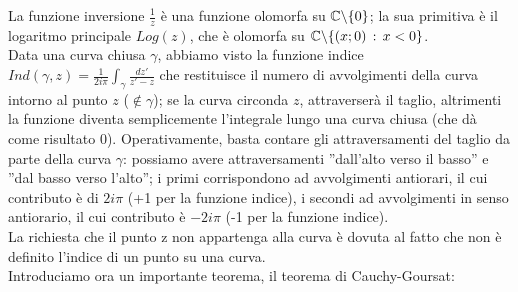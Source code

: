 La funzione inversione $\frac{1}{z}$  è una funzione olomorfa su $\mathbb{C} \backslash \{0\}$; la sua primitiva è il logaritmo principale $Log(z)$, che è olomorfa su $\mathbb{C} \backslash \{(x;0) \, : \, x<0\}$. \\ Data una curva chiusa $\gamma$, abbiamo visto la funzione indice $Ind(\gamma,z)=\frac{1}{2i \pi} \int_{\gamma} \frac{dz'}{z'-z}$ che restituisce il numero di avvolgimenti della curva intorno al punto $z$ ($\notin \gamma$); se la curva circonda $z$, attraverserà il taglio, altrimenti la funzione diventa semplicemente l'integrale lungo una curva chiusa (che dà come risultato 0). Operativamente, basta contare gli attraversamenti del taglio da parte della curva $\gamma$: possiamo avere attraversamenti ''dall'alto verso il basso'' e ''dal basso verso l'alto''; i primi corrispondono ad avvolgimenti antiorari, il cui contributo è di $2i \pi$ (+1 per la funzione indice), i secondi ad avvolgimenti in senso antiorario, il cui contributo è $-2i \pi$ (-1 per la funzione indice). \\ La richiesta che il punto z non appartenga alla curva è dovuta al fatto che non è definito l'indice di un punto su una curva.
\\
Introduciamo ora un importante teorema, il teorema di Cauchy-Goursat:

